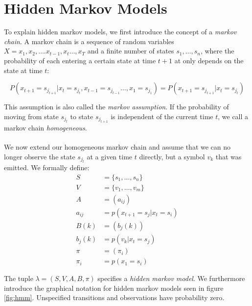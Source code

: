 \section{Hidden Markov Models}
To explain hidden markov models, we first introduce the concept of a \textit{markov chain}. A markov chain is a sequence of random variables $X = x_1, x_2, \dots. x_{t - 1}, x_{t} \dots, x_T$ and a finite number of states $s_1, \dots, s_n$, where the probability of each entering a certain state at time $t + 1$ at only depends on the state at time $t$:

\[
P(x_{t + 1} = s_{j_{t + 1}} | x_{t} = s_{j_t}, x_{t - 1} = s_{j_{t - 1}} \dots, x_{1} = s_{j_{1}}) = P(x_{t + 1} = s_{j_{t + 1}} | x_{t} = s_{j_t})
\] 

This assumption is also called the \textit{markov assumption}. If the probability of moving from state $s_{j_t}$ to state $s_{j_{t + 1}}$ is independent of the current time $t$, we call a markov chain \textit{homogeneous}. \\ \\
We now extend our homogeneous markov chain and assume that we can no longer observe the state $s_{j_t}$ at a given time $t$ directly, but a symbol $v_k$ that was emitted. We formally define: 
\begin{align*}
S &= \{s_1, \dots, s_n\} \tag{states} \\
V &= \{v_1, \dots, v_m\} \tag{symbols} \\
A &= (a_{ij}) \tag{state tansmission probability} \\
a_{ij} &= p(x_{t+1} = s_j | x_{t} = s_i) \\
B(k) &= (b_j(k)) \tag{emisson probability} \\
b_j(k) &= p(v_k | x_t = s_j) \\
\pi &= (\pi_i) \tag{initial state probability} \\
\pi_i &= p(x_1 = s_i)
\end{align*}

The tuple $\lambda = (S, V, A, B, \pi)$ specifies a \textit{hidden markov model}. We furthermore introduce the graphical notation for hidden markov models seen in figure \ref{fig:hmm}. Unspecified transitions and observations have probability zero. 

